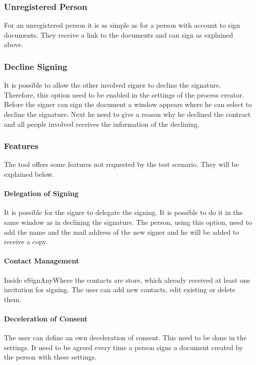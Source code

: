 \subsubsection{Unregistered Person}
For an unregistered person it is as simple as for a person with account to sign documents. They receive a link to the documents and can sign as explained above. 

\subsubsection{Decline Signing}
It is possible to allow the other involved signer to decline the signature. Therefore, this option need to be enabled in the settings of the process creator. Before the signer can sign the document a window appears where he can select to decline the signature. Next he need to give a reason why he declined the contract and all people involved receives the information of the declining.

\subsubsection{Features}
The tool offers some features not requested by the test scenario. They will be explained below.

\paragraph{Delegation of Signing}
It is possible for the signer to delegate the signing. It is possible to do it in the same window as in declining the signature. The person, using this option, need to add the name and the mail address of the new signer and he will be added to receive a copy.

\paragraph{Contact Management}
Inside eSignAnyWhere the contacts are store, which already received at least one invitation for signing. The user can add new contacts, edit existing or delete them.

\paragraph{Deceleration of Consent}
The user can define an own deceleration of consent. This need to be done in the settings. It need to be agreed every time a person signs a document created by the person with these settings.

